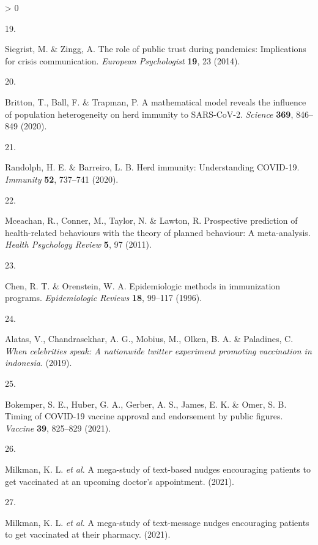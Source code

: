 \documentclass[
  12pt,
]{article}
\newlength{\cslhangindent}
\newlength{\csllabelwidth}
\newenvironment{CSLReferences}[2] %
 {%
  \setlength{\parindent}{0pt}
  \ifodd #1 \everypar{\setlength{\hangindent}{\cslhangindent}}\ignorespaces\fi
  \ifnum #2 > 0
  \setlength{\parskip}{#2\baselineskip}
  \fi
 }%
 {}
\newcommand{\CSLLeftMargin}[1]{\parbox[t]{\csllabelwidth}{#1}}
\newcommand{\CSLRightInline}[1]{\parbox[t]{\linewidth - \csllabelwidth}{#1}\break}
\begin{document}
\begin{CSLReferences}{0}{0}
\leavevmode\hypertarget{ref-siegrist2014role}{}%
\CSLLeftMargin{19. }
\CSLRightInline{Siegrist, M. \& Zingg, A. The role of public trust during pandemics: Implications for crisis communication. \emph{European Psychologist} \textbf{19}, 23 (2014).}

\leavevmode\hypertarget{ref-britten2020}{}%
\CSLLeftMargin{20. }
\CSLRightInline{Britton, T., Ball, F. \& Trapman, P. A mathematical model reveals the influence of population heterogeneity on herd immunity to SARS-CoV-2. \emph{Science} \textbf{369}, 846--849 (2020).}

\leavevmode\hypertarget{ref-haley2020}{}%
\CSLLeftMargin{21. }
\CSLRightInline{Randolph, H. E. \& Barreiro, L. B. Herd immunity: Understanding COVID-19. \emph{Immunity} \textbf{52}, 737--741 (2020).}

\leavevmode\hypertarget{ref-mceachanetal2011}{}%
\CSLLeftMargin{22. }
\CSLRightInline{Mceachan, R., Conner, M., Taylor, N. \& Lawton, R. Prospective prediction of health-related behaviours with the theory of planned behaviour: A meta-analysis. \emph{Health Psychology Review} \textbf{5}, 97 (2011).}

\leavevmode\hypertarget{ref-chen1996}{}%
\CSLLeftMargin{23. }
\CSLRightInline{Chen, R. T. \& Orenstein, W. A. Epidemiologic methods in immunization programs. \emph{Epidemiologic Reviews} \textbf{18}, 99--117 (1996).}

\leavevmode\hypertarget{ref-alatas2019celebrities}{}%
\CSLLeftMargin{24. }
\CSLRightInline{Alatas, V., Chandrasekhar, A. G., Mobius, M., Olken, B. A. \& Paladines, C. \emph{When celebrities speak: A nationwide twitter experiment promoting vaccination in indonesia}. (2019).}

\leavevmode\hypertarget{ref-bokemper2021timing}{}%
\CSLLeftMargin{25. }
\CSLRightInline{Bokemper, S. E., Huber, G. A., Gerber, A. S., James, E. K. \& Omer, S. B. Timing of COVID-19 vaccine approval and endorsement by public figures. \emph{Vaccine} \textbf{39}, 825--829 (2021).}

\leavevmode\hypertarget{ref-milkmanetal2021a}{}%
\CSLLeftMargin{26. }
\CSLRightInline{Milkman, K. L. \emph{et al.} A mega-study of text-based nudges encouraging patients to get vaccinated at an upcoming doctor's appointment. (2021).}

\leavevmode\hypertarget{ref-milkmanetal2021b}{}%
\CSLLeftMargin{27. }
\CSLRightInline{Milkman, K. L. \emph{et al.} A mega-study of text-message nudges encouraging patients to get vaccinated at their pharmacy. (2021).}


\end{CSLReferences}
\end{document}
